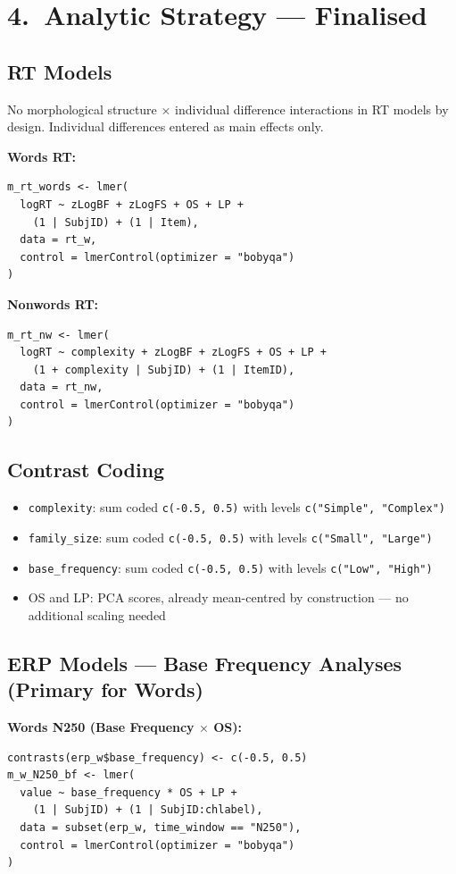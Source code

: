 \documentclass[11pt, a4paper]{article}
\begin{document}
\section{4.\ Analytic Strategy — Finalised}

\subsection{RT Models}

No morphological structure $\times$ individual difference interactions in RT models by design. Individual differences entered as main effects only.

\textbf{Words RT:}
\begin{lstlisting}
m_rt_words <- lmer(
  logRT ~ zLogBF + zLogFS + OS + LP +
    (1 | SubjID) + (1 | Item),
  data = rt_w,
  control = lmerControl(optimizer = "bobyqa")
)
\end{lstlisting}

\textbf{Nonwords RT:}
\begin{lstlisting}
m_rt_nw <- lmer(
  logRT ~ complexity + zLogBF + zLogFS + OS + LP +
    (1 + complexity | SubjID) + (1 | ItemID),
  data = rt_nw,
  control = lmerControl(optimizer = "bobyqa")
)
\end{lstlisting}

\subsection{Contrast Coding}

\begin{itemize}[leftmargin=1.5em]
  \item \texttt{complexity}: sum coded \texttt{c(-0.5, 0.5)} with levels \texttt{c("Simple", "Complex")}
  \item \texttt{family\_size}: sum coded \texttt{c(-0.5, 0.5)} with levels \texttt{c("Small", "Large")}
  \item \texttt{base\_frequency}: sum coded \texttt{c(-0.5, 0.5)} with levels \texttt{c("Low", "High")}
  \item OS and LP: PCA scores, already mean-centred by construction — no additional scaling needed
\end{itemize}

\subsection{ERP Models — Base Frequency Analyses (Primary for Words)}

\textbf{Words N250 (Base Frequency $\times$ OS):}
\begin{lstlisting}
contrasts(erp_w$base_frequency) <- c(-0.5, 0.5)
m_w_N250_bf <- lmer(
  value ~ base_frequency * OS + LP +
    (1 | SubjID) + (1 | SubjID:chlabel),
  data = subset(erp_w, time_window == "N250"),
  control = lmerControl(optimizer = "bobyqa")
)
\end{lstlisting}
\end{document}
